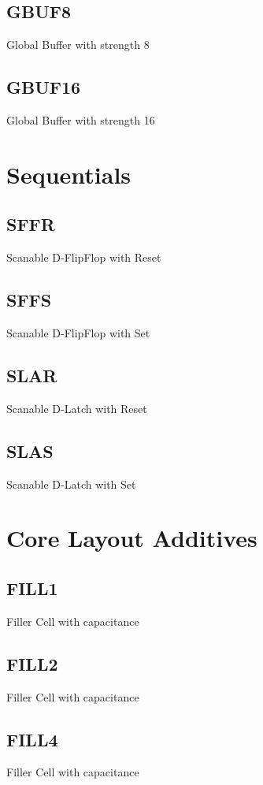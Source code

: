\documentclass[12pt, a4paper, twoside, titlepage]{article}
\begin{document}
\subsection{GBUF8}
Global Buffer with strength 8

\subsection{GBUF16}
Global Buffer with strength 16


\section{Sequentials}

\subsection{SFFR}
Scanable D-FlipFlop with Reset

\subsection{SFFS}
Scanable D-FlipFlop with Set

\subsection{SLAR}
Scanable D-Latch with Reset

\subsection{SLAS}
Scanable D-Latch with Set


\section{Core Layout Additives}

\subsection{FILL1}
Filler Cell with capacitance

\subsection{FILL2}
Filler Cell with capacitance

\subsection{FILL4}
Filler Cell with capacitance
\end{document}
